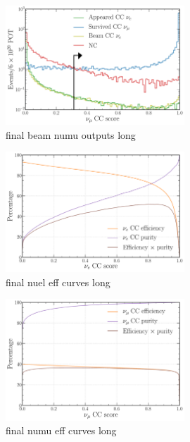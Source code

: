 \begin{figure} %
    \includegraphics[width=0.6\textwidth]{diagrams/6-cvn/chipsnet/final_beam_numu_outputs.pdf}
    \caption[final beam numu outputs short]
    {final beam numu outputs long}
    \label{fig:final_beam_numu_outputs}
\end{figure}

\begin{figure} %
    \includegraphics[width=0.6\textwidth]{diagrams/6-cvn/chipsnet/final_nuel_eff_curves.pdf}
    \caption[final nuel eff curves short]
    {final nuel eff curves long}
    \label{fig:final_nuel_eff_curves}
\end{figure}

\begin{figure} %
    \includegraphics[width=0.6\textwidth]{diagrams/6-cvn/chipsnet/final_numu_eff_curves.pdf}
    \caption[final numu eff curves short]
    {final numu eff curves long}
    \label{fig:final_numu_eff_curves}
\end{figure}


